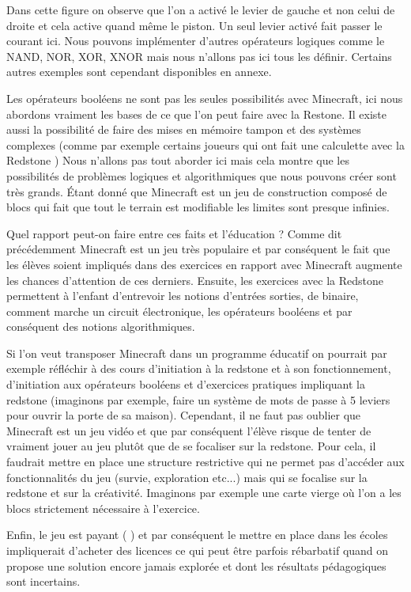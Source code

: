 Dans cette figure on observe que l'on a activé le levier de gauche et non celui de droite et cela active quand même le piston. Un seul levier activé fait passer le courant ici. Nous pouvons implémenter d'autres opérateurs logiques comme le NAND, NOR, XOR, XNOR mais nous n'allons pas ici tous les définir. Certains autres exemples sont cependant disponibles en annexe.

Les opérateurs booléens ne sont pas les seules possibilités avec Minecraft, ici nous abordons vraiment les bases de ce que l'on peut faire avec la Restone. Il existe aussi la possibilité de faire des mises en mémoire tampon et des systèmes complexes (comme par exemple certains joueurs qui ont fait une calculette avec la Redstone \cite{60}) Nous n'allons pas tout aborder ici mais cela montre que les possibilités de problèmes logiques et algorithmiques que nous pouvons créer sont très grands. Étant donné que Minecraft est un jeu de construction composé de blocs qui fait que tout le terrain est modifiable les limites sont presque infinies.

Quel rapport peut-on faire entre ces faits et l'éducation ? Comme dit précédemment Minecraft est un jeu très populaire et par conséquent le fait que les élèves soient impliqués dans des exercices en rapport avec Minecraft augmente les chances d'attention de ces derniers. Ensuite, les exercices avec la Redstone permettent à l'enfant d'entrevoir les notions d'entrées sorties, de binaire, comment marche un circuit électronique, les opérateurs booléens et par conséquent des notions algorithmiques.

Si l'on veut transposer Minecraft dans un programme éducatif on pourrait par exemple réfléchir à des cours d'initiation à la redstone et à son fonctionnement, d'initiation aux opérateurs booléens et d'exercices pratiques impliquant la redstone (imaginons par exemple, faire un système de mots de passe à 5 leviers pour ouvrir la porte de sa maison). Cependant, il ne faut pas oublier que Minecraft est un jeu vidéo et que par conséquent l'élève risque de tenter de vraiment jouer au jeu plutôt que de se focaliser sur la redstone. Pour cela, il faudrait mettre en place une structure restrictive qui ne permet pas d'accéder aux fonctionnalités du jeu (survie, exploration etc...) mais qui se focalise sur la redstone et sur la créativité. Imaginons par exemple une carte vierge où l'on a les blocs strictement nécessaire à l'exercice. 

Enfin, le jeu est payant ( ) et par conséquent le mettre en place dans les écoles impliquerait d'acheter des licences ce qui peut être parfois rébarbatif quand on propose une solution encore jamais explorée et dont les résultats pédagogiques sont incertains.

